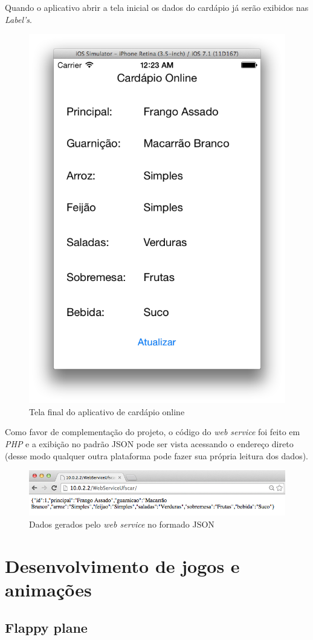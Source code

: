 \documentclass[a4paper,12pt,brazil,oneside]{book}
\begin{document}
Quando o aplicativo abrir a tela inicial os dados do cardápio já serão exibidos nas \emph{Label's}.

\begin{figure}[H]
  \centering
  \includegraphics[width=.55\textwidth]{figuras/5/APP_Cardapio2.png}
  \caption{Tela final do aplicativo de cardápio online}
  \label{fig:app_cardapio2}
\end{figure}

Como favor de complementação do projeto, o código do \emph{web service} foi feito em \emph{PHP} e a exibição no padrão JSON pode ser vista acessando o endereço direto (desse modo qualquer outra plataforma pode fazer sua própria leitura dos dados).

\begin{figure}[H]
  \centering
  \includegraphics[width=.75\textwidth]{figuras/5/APP_Cardapio3.png}
  \caption{Dados gerados pelo \emph{web service} no formado JSON}
  \label{fig:a}
\end{figure}


\chapter{Desenvolvimento de jogos e animações}

\section{Flappy plane}
\end{document}
